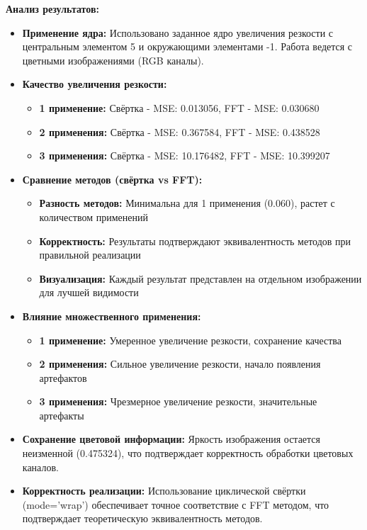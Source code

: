 \textbf{Анализ результатов:}
\begin{itemize}
    \item \textbf{Применение ядра:} Использовано заданное ядро увеличения резкости с центральным элементом 5 и окружающими элементами -1. Работа ведется с цветными изображениями (RGB каналы).
    
    \item \textbf{Качество увеличения резкости:} 
    \begin{itemize}
        \item \textbf{1 применение:} Свёртка - MSE: 0.013056, FFT - MSE: 0.030680
        \item \textbf{2 применения:} Свёртка - MSE: 0.367584, FFT - MSE: 0.438528
        \item \textbf{3 применения:} Свёртка - MSE: 10.176482, FFT - MSE: 10.399207
    \end{itemize}
    
    \item \textbf{Сравнение методов (свёртка vs FFT):} 
    \begin{itemize}
        \item \textbf{Разность методов:} Минимальна для 1 применения (0.060), растет с количеством применений
        \item \textbf{Корректность:} Результаты подтверждают эквивалентность методов при правильной реализации
        \item \textbf{Визуализация:} Каждый результат представлен на отдельном изображении для лучшей видимости
    \end{itemize}
    
    \item \textbf{Влияние множественного применения:} 
    \begin{itemize}
        \item \textbf{1 применение:} Умеренное увеличение резкости, сохранение качества
        \item \textbf{2 применения:} Сильное увеличение резкости, начало появления артефактов
        \item \textbf{3 применения:} Чрезмерное увеличение резкости, значительные артефакты
    \end{itemize}
    
    \item \textbf{Сохранение цветовой информации:} Яркость изображения остается неизменной (0.475324), что подтверждает корректность обработки цветовых каналов.
    
    \item \textbf{Корректность реализации:} Использование циклической свёртки (mode='wrap') обеспечивает точное соответствие с FFT методом, что подтверждает теоретическую эквивалентность методов.
\end{itemize}

